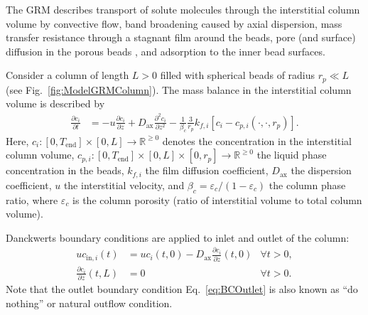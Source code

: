 The GRM describes transport of solute molecules through the interstitial column volume by convective flow, band broadening caused by axial dispersion, mass transfer resistance through a stagnant film around the beads, pore (and surface) diffusion in the porous beads \cite{Ma1996, Schneider1968a, Miyabe2007}, and adsorption to the inner bead surfaces.

Consider a column of length $L>0$ filled with spherical beads of radius $r_p \ll L$ (see Fig.~\ref{fig:ModelGRMColumn}). 
The mass balance in the interstitial column volume is described by
\begin{align}
	\frac{\partial c_i}{\partial t} &= -u \frac{\partial c_i}{\partial z} + D_{\text{ax}} \frac{\partial^2 c_i}{\partial z^2} - \frac{1}{\beta_c}\frac{3}{r_p}k_{f,i}\left[ c_i - c_{p,i}(\cdot, \cdot, r_p) \right]. \label{eq:ModelColumn}
\end{align}
Here, $c_i\colon \left[0, T_{\text{end}}\right] \times [0, L] \rightarrow \mathds{R}^{\geq 0}$ denotes the concentration in the interstitial column volume, $c_{p,i}\colon \left[0, T_{\text{end}}\right] \times [0, L] \times [0, r_p] \rightarrow \mathds{R}^{\geq 0}$ the liquid phase concentration in the beads, $k_{f,i}$ the film diffusion coefficient, $D_{\text{ax}}$ the dispersion coefficient, $u$ the interstitial velocity, and $\beta_c = \varepsilon_c / (1 - \varepsilon_c)$ the column phase ratio, where $\varepsilon_c$ is the column porosity (ratio of interstitial volume to total column volume).

Danckwerts boundary conditions \cite{Danckwerts1953} are applied to inlet and outlet of the column:
\begin{align}
	u c_{\text{in},i}(t) &= u c_i(t,0) - D_{\text{ax}} \frac{\partial c_i}{\partial z}(t, 0) \label{eq:BCInlet} & \forall t > 0,\\
	\frac{\partial c_i}{\partial z}(t, L) &= 0 & \forall t > 0. \label{eq:BCOutlet}
\end{align}
Note that the outlet boundary condition Eq.~\eqref{eq:BCOutlet} is also known as ``do nothing'' or natural outflow condition.

